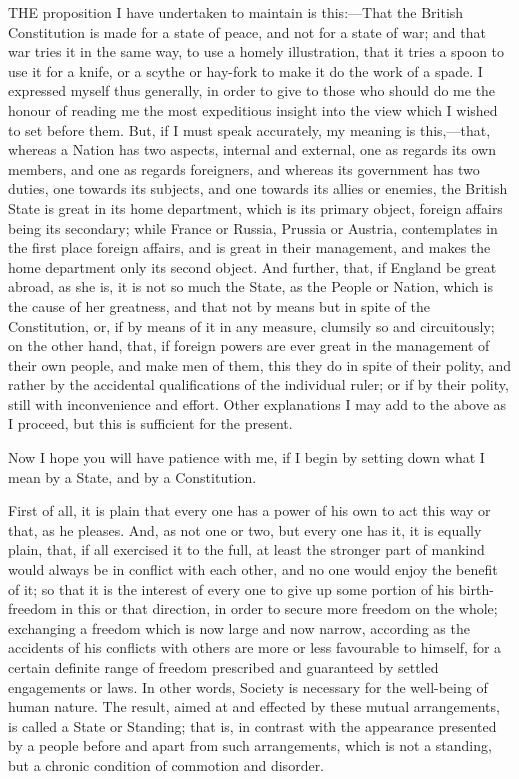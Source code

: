 THE
proposition I have undertaken to maintain is this:—That the British
Constitution is made for a state of peace, and not for a state of war;
and that war tries it in the same way, to use a homely illustration,
that it tries a spoon to use it for a knife, or a scythe or hay-fork
to make it do the work of a spade. I expressed myself thus generally,
in order to give to those who should do me the honour of reading me
the most expeditious insight into the view which I wished to set
before them. But, if I must speak accurately, my meaning is
this,—that, whereas a Nation has two aspects, internal and external,
one as regards its own members, and one as regards foreigners, and
whereas its government has two duties, one towards its subjects, and
one towards its allies or enemies, the British State is great in its
home department, which is its primary object, foreign affairs being
its secondary; while France or Russia, Prussia or Austria,
contemplates in the first place foreign affairs, and is great in their
management, and makes the home department only its second object. And
further, that, if England be great abroad, as she is, it is not so
much the State, as the People or Nation, which is the cause of her
greatness, and that not by means but in spite of the Constitution, or,
if by means of it in any measure, clumsily so and circuitously; on the
other hand, that, if foreign powers are ever great in the management
of their own people, and make men of them, this they do in spite
of their polity, and rather by the accidental qualifications of the
individual ruler; or if by their polity, still with inconvenience and
effort. Other explanations I may add to the above as I proceed, but
this is sufficient for the present.

Now I hope you will have patience with me, if I
begin by setting down what I mean by a State, and by a Constitution.

First of all, it is plain that every one has a
power of his own to act this way or that, as he pleases. And, as not
one or two, but every one has it, it is equally plain, that, if all
exercised it to the full, at least the stronger part of mankind would
always be in conflict with each other, and no one would enjoy the
benefit of it; so that it is the interest of every one to give up some
portion of his birth-freedom in this or that direction, in order to
secure more freedom on the whole; exchanging a freedom which is now
large and now narrow, according as the accidents of his conflicts with
others are more or less favourable to himself, for a certain definite
range of freedom prescribed and guaranteed by settled engagements or
laws. In other words, Society is necessary for the well-being of human
nature. The result, aimed at and effected by these mutual
arrangements, is called a State or Standing; that is, in contrast with
the appearance presented by a people before and apart from such
arrangements, which is not a standing, but a chronic condition of
commotion and disorder.

